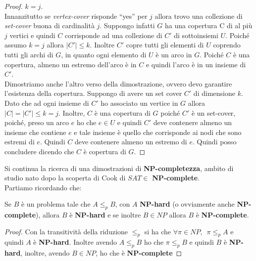 \begin{proof}
											$k=j$.\\
											Innanzitutto se \textit{vertex-cover} risponde ``yes'' per $j$ allora trovo
											una collezione di \textit{set-cover} buona di cardinalità $j$. Suppongo
											infatti $G$ ha una copertura C di al più $j$ vertici e quindi $C$ corrisponde
											ad una collezione di $C'$ di sottoinsiemi $U$. Poiché assumo $k=j$ allora
											$|C'|\leq k$. Inoltre $C'$ copre tutti gli elementi di $U$ coprendo tutti gli
											archi di $G$, in quanto ogni elemento di $U$ è un arco in $G$. Poiché $C$ è
											una copertura, almeno un estremo dell’arco è in $C$  e quindi l’arco è in un
											insieme di $C'$.\\
											Dimostriamo anche l'altro verso della dimostrazione, ovvero devo garantire
											l'esistenza della copertura. Suppongo di avere un set cover $C'$ di dimensione
											$k$. Dato che ad ogni insieme di $C'$ ho associato un vertice in $G$ allora
											$|C|=|C'|\leq k=j$. Inoltre, $C$ è una copertura di $G$ poiché $C'$ è un
											set-cover, poiché, preso un arco $e$ ho che $e\in U$ e quindi $C'$ deve
											contenere almeno un insieme che contiene $e$ e tale insieme è quello che
											corrisponde ai nodi che sono estremi di $e$. Quindi $C$ deve contenere almeno
											un estremo di $e$. Quindi posso concludere dicendo che $C$ è copertura di $G$.
										\end{proof}
										Si continua la ricerca di una dimostrazioni di \textbf{NP-completezza}, ambito
										di studio nato dopo la scoperta di Cook di $SAT\in$ \textbf{NP-complete}.\\
										Partiamo ricordando che:
										\begin{teorema}
											Se $B$ è un problema tale che $A\leq_p B$, con $A$
											\textbf{NP-hard} (o ovviamente anche \textbf{NP-complete}), allora $B$ è
											\textbf{NP-hard} e se inoltre $B\in NP$ allora $B$ è \textbf{NP-complete}.  
										\end{teorema}
										\begin{proof}
											Con la transitività della riduzione $\leq_p$ si ha che $\forall\pi\in
											NP,\,\,\, \pi\leq_p A$ e quindi $A$ è \textbf{NP-hard}. Inoltre avendo
											$A\leq_p B$ ho che  $\pi\leq_p B$ e quindi $B$ è \textbf{NP-hard}, inoltre,
											avendo $B\in NP$, ho che è \textbf{NP-complete}
										\end{proof}
																				
